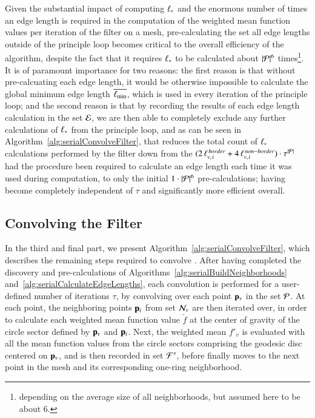 Given the substantial impact of computing ${\ell_\ast}$ and the enormous number of times an edge length is required in the computation of the weighted mean function values per iteration of the filter on a mesh, pre-calculating the set all edge lengths outside of the principle loop becomes critical to the overall efficiency of the algorithm, despite the fact that it requires ${\ell_\ast}$ to be calculated about $|\mathcal{P}|^6$ times\footnote{depending on the average size of all neighborhoods, but assumed here to be about 6.}. It is of paramount importance for two reasons: the first reason is that without pre-calcuating each edge length, it would be otherwise impossible to calculate the global minimum  edge length $\overline{\ell_\text{min}}$, which is used in every iteration of the principle loop; and the second reason is that by recording the results of each edge length calculation in the set $\mathcal{E}$, we are then able to completely exclude any further calculations of $\ell_\ast$ from the principle loop, and as can be seen in Algorithm~\ref{alg:serialConvolveFilter}, that reduces the total count of $\ell_\ast$ calculations performed by the filter down from the $(2\,\ell_{v,\kern.75pt i}^{\,border} + 4\,\ell_{v,\kern.75pt i}^{\,non-border})\cdot\tau^{|\mathcal{P}|}$ had the procedure been required to calculate an edge length each time it was used during computation, to only the initial $1\cdot |\mathcal{P}|^6$ pre-calculations; having become completely independent of $\tau$ and significantly more efficient overall.%
%

%
%
\subsection{Convolving the Filter}
\label{ch5sSIssCF}
In the third and final part, we present Algorithm~\ref{alg:serialConvolveFilter}, which describes the remaining steps required to convolve . After having completed the discovery and pre-calculations of Algorithms~\ref{alg:serialBuildNeighborhoods} and~\ref{alg:serialCalculateEdgeLengths}, each convolution is performed for a user-defined number of iterations $\tau$, by convolving over each point $\mathbf{p}_v$ in the set $\mathcal{P}$. At each point, the neighboring points $\mathbf{p}_i$ from set $\mathcal{N}_v$ are then iterated over, in order to calculate each weighted mean function value $\check{f}$ at the center of gravity of the circle sector defined by $\mathbf{p}_v$ and $\mathbf{p}_i$. Next, the weighted mean $f'_v$ is evaluated with all the mean function values from the circle sectors comprising the geodesic disc centered on $\mathbf{p}_v$,  and is then recorded in set $\mathcal{F}'$, before  finally moves to the next point in the mesh and its corresponding one-ring neighborhood.

